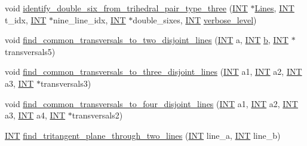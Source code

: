 \begin{DoxyCompactItemize}
\item 
void \mbox{\hyperlink{classsurface__object_a723aad2a111e80cbe2e64323331d7f34}{identify\+\_\+double\+\_\+six\+\_\+from\+\_\+trihedral\+\_\+pair\+\_\+type\+\_\+three}} (\mbox{\hyperlink{galois_8h_a09fddde158a3a20bd2dcadb609de11dc}{I\+NT}} $\ast$\mbox{\hyperlink{classsurface__object_a0fae2a45446843f691e91d58fb905afe}{Lines}}, \mbox{\hyperlink{galois_8h_a09fddde158a3a20bd2dcadb609de11dc}{I\+NT}} t\+\_\+idx, \mbox{\hyperlink{galois_8h_a09fddde158a3a20bd2dcadb609de11dc}{I\+NT}} $\ast$nine\+\_\+line\+\_\+idx, \mbox{\hyperlink{galois_8h_a09fddde158a3a20bd2dcadb609de11dc}{I\+NT}} $\ast$double\+\_\+sixes, \mbox{\hyperlink{galois_8h_a09fddde158a3a20bd2dcadb609de11dc}{I\+NT}} \mbox{\hyperlink{simeon_8_c_a818073fbcc2f439e7c56952f67386122}{verbose\+\_\+level}})
\item 
void \mbox{\hyperlink{classsurface__object_a04e29003af9e593bf04ccbe9e16e790e}{find\+\_\+common\+\_\+transversals\+\_\+to\+\_\+two\+\_\+disjoint\+\_\+lines}} (\mbox{\hyperlink{galois_8h_a09fddde158a3a20bd2dcadb609de11dc}{I\+NT}} a, \mbox{\hyperlink{galois_8h_a09fddde158a3a20bd2dcadb609de11dc}{I\+NT}} \mbox{\hyperlink{alphabet2_8_c_a148e3876077787926724625411d6e7a9}{b}}, \mbox{\hyperlink{galois_8h_a09fddde158a3a20bd2dcadb609de11dc}{I\+NT}} $\ast$transversals5)
\item 
void \mbox{\hyperlink{classsurface__object_a767a62191b48c97e6b8ffb7e1eaccb5d}{find\+\_\+common\+\_\+transversals\+\_\+to\+\_\+three\+\_\+disjoint\+\_\+lines}} (\mbox{\hyperlink{galois_8h_a09fddde158a3a20bd2dcadb609de11dc}{I\+NT}} a1, \mbox{\hyperlink{galois_8h_a09fddde158a3a20bd2dcadb609de11dc}{I\+NT}} a2, \mbox{\hyperlink{galois_8h_a09fddde158a3a20bd2dcadb609de11dc}{I\+NT}} a3, \mbox{\hyperlink{galois_8h_a09fddde158a3a20bd2dcadb609de11dc}{I\+NT}} $\ast$transversals3)
\item 
void \mbox{\hyperlink{classsurface__object_a64f5dd248a3f8d73be3422e00478a4bd}{find\+\_\+common\+\_\+transversals\+\_\+to\+\_\+four\+\_\+disjoint\+\_\+lines}} (\mbox{\hyperlink{galois_8h_a09fddde158a3a20bd2dcadb609de11dc}{I\+NT}} a1, \mbox{\hyperlink{galois_8h_a09fddde158a3a20bd2dcadb609de11dc}{I\+NT}} a2, \mbox{\hyperlink{galois_8h_a09fddde158a3a20bd2dcadb609de11dc}{I\+NT}} a3, \mbox{\hyperlink{galois_8h_a09fddde158a3a20bd2dcadb609de11dc}{I\+NT}} a4, \mbox{\hyperlink{galois_8h_a09fddde158a3a20bd2dcadb609de11dc}{I\+NT}} $\ast$transversals2)
\item 
\mbox{\hyperlink{galois_8h_a09fddde158a3a20bd2dcadb609de11dc}{I\+NT}} \mbox{\hyperlink{classsurface__object_a3208e9a0a373dccc4569bf14b618dc9d}{find\+\_\+tritangent\+\_\+plane\+\_\+through\+\_\+two\+\_\+lines}} (\mbox{\hyperlink{galois_8h_a09fddde158a3a20bd2dcadb609de11dc}{I\+NT}} line\+\_\+a, \mbox{\hyperlink{galois_8h_a09fddde158a3a20bd2dcadb609de11dc}{I\+NT}} line\+\_\+b)

\end{DoxyCompactItemize}
